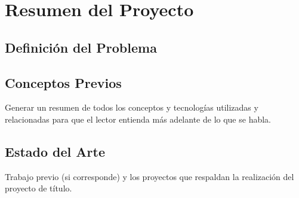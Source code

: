 \chapter{Resumen del Proyecto}
\section{Definición del Problema}
\blindtext %
 

\section{Conceptos Previos}
Generar un resumen de todos los conceptos y tecnologías utilizadas y relacionadas para que el lector entienda más adelante de lo que se habla.
\section{Estado del Arte}
Trabajo previo (si corresponde) y los proyectos que respaldan la realización del proyecto de título.